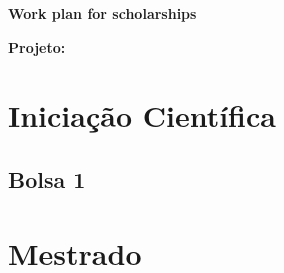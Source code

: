 \documentclass[onecolumn,a4paper,12pt]{article}
\newcommand{\DocumentTitle}{%
  Work plan for scholarships
}
\begin{document}
\begin{spacing}{2}
  \noindent
  {\LARGE \textbf{\DocumentTitle}}
\end{spacing}

\noindent
\textbf{Projeto:} \TitlePt


%

\section{Iniciação Científica}

\subsection{Bolsa 1}


\lipsum[1-5]


\newpage

\section{Mestrado}

\lipsum[1-5]
\end{document}
